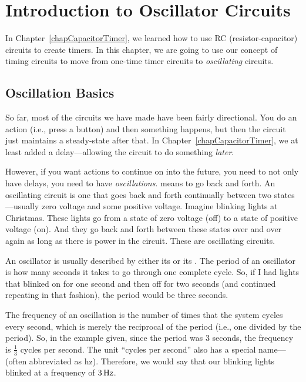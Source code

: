 \chapter{Introduction to Oscillator Circuits}
\label{chapOscillators}

In Chapter~\ref{chapCapacitorTimer}, we learned how to use RC (resistor-capacitor) circuits to create timers.  
In this chapter, we are going to use our concept of timing circuits to move from one-time timer circuits to \emph{oscillating} circuits.

\section{Oscillation Basics}

So far, most of the circuits we have made have been fairly directional.  
You do an action (i.e., press a button) and then something happens, but then the circuit just maintains a steady-state after that.
In Chapter~\ref{chapCapacitorTimer}, we at least added a delay---allowing the circuit to do something \emph{later}.

However, if you want actions to continue on into the future, you need to not only have delays, you need to have \emph{oscillations}.
 means to go back and forth.
An oscillating circuit is one that goes back and forth continually between two states---usually zero voltage and some positive voltage.
Imagine blinking lights at Christmas.
These lights go from a state of zero voltage (off) to a state of positive voltage (on). 
And they go back and forth between these states over and over again as long as there is power in the circuit.
These are oscillating circuits.

An oscillator is usually described by either its  or its .
The period of an oscillator is how many seconds it takes to go through one complete cycle.  
So, if I had lights that blinked on for one second and then off for two seconds (and continued repeating in that fashion), the period would be three seconds.

The frequency of an oscillation is the number of times that the system cycles every second, which is merely the reciprocal of the period (i.e., one divided by the period).
So, in the example given, since the period was 3 seconds, the frequency is $\frac{1}{3}$ cycles per second.
The unit ``cycles per second'' also has a special name--- (often abbreviated as hz).
Therefore, we would say that our blinking lights blinked at a frequency of $3\,\si{\hertz}$.


